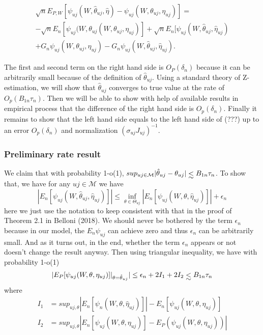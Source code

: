 \documentclass{article}
\makeatletter
\let\originallesssim\lesssim
\DeclareRobustCommand{\lesssim}{%
  \mathrel{\mathpalette\lowersim\originallesssim}%
}
\newcommand{\lowersim}[2]{%
  \sbox\z@{$#1<$}%
  \raisebox{-\dimexpr\height-\ht\z@}{$\m@th#1#2$}%
}
\makeatother
\begin{document}
\begin{equation}
\begin{split}
     \sqrt{n} E_{P,W}[\psi_{uj}(W,\hat{\theta}_{uj},\hat{\eta})-\psi_{uj}(W,\theta_{uj},\eta_{uj})]=\\
    -\sqrt{n}E_n[\psi_{uj}(W,\theta_{uj}(W,\theta_{uj},\eta_{uj})]+\sqrt{n}E_n[\psi_{uj}(W,\hat{\theta}_{uj},\hat{\eta}_{uj})\\
    +G_n\psi_{uj}(W,\theta_{uj},\eta_{uj})-G_n \psi_{uj}(W,\hat{\theta}_{uj},\hat{\eta}_{uj}).
\end{split}
\end{equation}

The first and second term on the right hand side is $O_P(\delta_n)$ because it can be arbitrarily small because of the definition of $\hat{\theta}_{uj}$. Using a standard theory of Z-estimation, we will show that $\hat{\theta}_{uj}$ converges to true value at the rate of $O_p(B_{1n}\tau_n)$. Then we will be able to show with help of available results in empirical process that the difference of the right hand side is $O_p(\delta_n)$. Finally it remains to show that the left hand side equals to the left hand side of (???) up to an error $O_p(\delta_n)$ and normalization $(\sigma_{uj}J_{uj})^{-1}$.


\subsubsection{Preliminary rate result}
We claim that with probability 1-o(1), $sup_{uj\in \mathcal{M}} |\hat{\theta}_{uj}-\theta_{uj}|\lesssim B_{1n}\tau_n$. To show that, we have for any $uj\in \mathcal{M}$ we have 
\begin{equation}
    |E_n[\psi_{uj}(W,\hat{\theta}_{uj},\hat{\eta}_{uj})]|\leq \inf_{\theta\in \Theta_{uj}}|E_n[\psi_{uj}(W,\theta,\hat{\eta}_{uj})]|+\epsilon_n
\end{equation}
here we just use the notation to keep consistent with that in the proof of Theorem 2.1 in Belloni (2018). We should never be bothered by the term $\epsilon_n$ because in our model, the $E_n \psi_{uj}$ can achieve zero and thus $\epsilon_n$ can be arbitrarily small. And as it turns out, in the end, whether the term $\epsilon_n$ appears or not doesn't change the result anyway. Then using triangular inequality, we have with probability 1-o(1)
\begin{equation}
    |E_P[\psi_{uj}(W,\theta,\eta_{uj})]|_{\theta=\hat{\theta}_{uj}}|\leq \epsilon_n+2I_1+2I_2\lesssim B_{1n}\tau_n
\end{equation}
where 
\begin{align*}
    I_1&=sup_{uj,\theta} |E_n[\psi_n(W,\theta,\hat{\eta}_{uj})]|-E_n[\psi_{uj}(W,\theta,\eta_{uj})]\\
    I_2&= sup_{uj,\theta}|E_n[\psi_{uj}(W,\theta,\eta_{uj})]-E_P(\psi_{uj}(W,\theta,\eta_{uj}))|
\end{align*}
\end{document}
